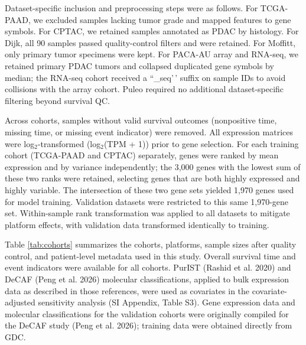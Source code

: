 \documentclass[
]{article}
\begin{document}
Dataset-specific inclusion and preprocessing steps were as follows. For
TCGA-PAAD, we excluded samples lacking tumor grade and mapped features
to gene symbols. For CPTAC, we retained samples annotated as PDAC by
histology. For Dijk, all 90 samples passed quality-control filters and
were retained. For Moffitt, only primary tumor specimens were kept. For
PACA-AU array and RNA-seq, we retained primary PDAC tumors and collapsed
duplicated gene symbols by median; the RNA-seq cohort received a
``\_seq'\,' suffix on sample IDs to avoid collisions with the array
cohort. Puleo required no additional dataset-specific filtering beyond
survival QC.

Across cohorts, samples without valid survival outcomes (nonpositive
time, missing time, or missing event indicator) were removed. All
expression matrices were log\(_2\)-transformed (log\(_2\)(TPM + 1))
prior to gene selection. For each training cohort (TCGA-PAAD and CPTAC)
separately, genes were ranked by mean expression and by variance
independently; the 3,000 genes with the lowest sum of these two ranks
were retained, selecting genes that are both highly expressed and highly
variable. The intersection of these two gene sets yielded 1,970 genes
used for model training. Validation datasets were restricted to this
same 1,970-gene set. Within-sample rank transformation was applied to
all datasets to mitigate platform effects, with validation data
transformed identically to training.

Table \ref{tab:cohorts} summarizes the cohorts, platforms, sample sizes
after quality control, and patient-level metadata used in this study.
Overall survival time and event indicators were available for all
cohorts. PurIST (Rashid et al. 2020) and DeCAF (Peng et al. 2026)
molecular classifications, applied to bulk expression data as described
in those references, were used as covariates in the covariate-adjusted
sensitivity analysis (SI Appendix, Table S3). Gene expression data and
molecular classifications for the validation cohorts were originally
compiled for the DeCAF study (Peng et al. 2026); training data were
obtained directly from GDC.
\end{document}
